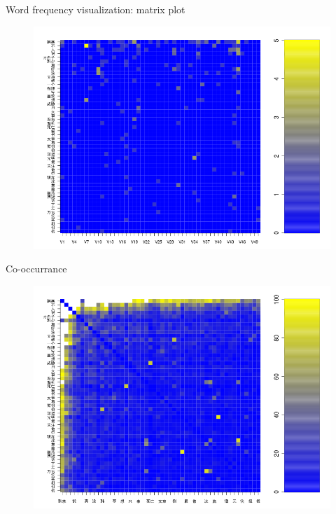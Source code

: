 \documentclass[12pt, trans]{beamer}
\newcommand{\1}[1]{{\mathbf 1}\left\{#1\right\}}        %
\begin{document}
\begin{frame}{Word frequency visualization: matrix plot}

\begin{figure}
  \centering
  \includegraphics[height=0.9\textheight]{./../../wordFreqMat.png} 
\end{figure}


\end{frame}

\begin{frame}{Co-occurrance}

\begin{figure}
  \centering
  \includegraphics[height=0.9\textheight]{./../../coocurResults/cooccurMatPlot.png} 
\end{figure}


\end{frame}
\end{document}
